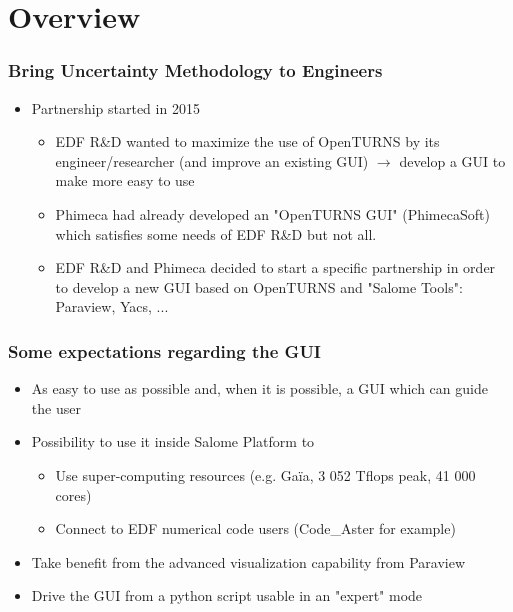 \documentclass[aspectratio=169]{beamer}
\begin{document}
\section{Overview}

\begin{frame}
  \frametitle{Bring Uncertainty Methodology to Engineers}
  \begin{itemize}
  \item Partnership started in 2015

    \begin{itemize}
    \item EDF R\&D wanted to maximize the use of OpenTURNS\textregistered{} by its engineer/researcher (and improve an existing GUI) $\rightarrow$ develop a GUI to make more easy to use

    \item Phimeca had already developed an "OpenTURNS GUI" (PhimecaSoft\textregistered{}) which satisfies some needs of EDF R\&D but not all.

    \item EDF R\&D and Phimeca decided to start a specific partnership in order to develop a new GUI based on OpenTURNS\textregistered{} and "Salome Tools": Paraview, Yacs, ...
    \end{itemize}
  \end{itemize}
\end{frame}


\begin{frame}
  \frametitle{Some expectations regarding the GUI}
  \begin{itemize}
  \item As easy to use as possible and, when it is possible, a GUI which can guide the user

  \item Possibility to use it inside Salome Platform to
    \begin{itemize}
    \item Use super-computing resources (e.g. Gaïa, 3 052 Tflops peak, 41 000 cores)
    \item Connect to EDF numerical code users (Code\_Aster for example)
    \end{itemize}

  \item Take benefit from the advanced visualization capability from Paraview

  \item Drive the GUI from a python script usable in an "expert" mode
  \end{itemize}
\end{frame}
\end{document}
